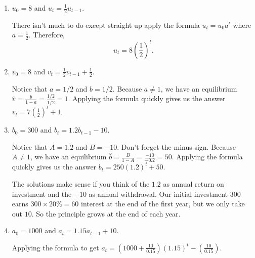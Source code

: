 \documentclass[../main.tex]{subfiles}
\begin{document}
\begin{exercise}
\begin{enumerate}
    \item \(u_{0} = 8\) and \(u_{t} = \frac{1}{2} u_{t-1}\).
      \begin{solution}
        There isn't much to do except straight up apply the formula \(u_{t} = u_{0} a^{t}\) where \(a = \frac{1}{2}\). Therefore, 
        \[
          u_{t} = 8 \left(\frac{1}{2}\right)^{t}.
        \]

      \end{solution}
    \item \(v_{0} = 8\) and \(v_{t} = \frac{1}{2} v_{t-1} + \frac{1}{2}\).
      \begin{solution}
        Notice that \(a = 1/2\) and \(b = 1/2\). Because \(a \ne 1\), we have an equilibrium \(\hat{v} = \frac{b}{1-a} = \frac{1/2}{1/2} = 1\).  Applying the formula quickly gives us the answer \(v_{t} = 7 \left(\frac{1}{2}\right)^{t} + 1\).
      \end{solution}
      
    \item \(b_{0} = 300\) and \(b_{t} = 1.2 b_{t-1} - 10\).
      \begin{solution}
        Notice that \(A = 1.2\) and \(B = -10\). Don't forget the minus sign. Because \(A \ne 1\), we have an equilibrium \(\hat{b} = \frac{B}{1-A} = \frac{-10}{-0.2} = 50\).  Applying the formula quickly gives us the answer \(b_{t} = 250 \left(1.2\right)^{t} + 50\).

        The solutions make sense if you think of the \(1.2\) as annual return on investment and the \(-10\) as annual withdrawal. Our initial investment \(300\) earns \(300 \times 20\% = 60\) interest at the end of the first year, but we only take out \(10\). So the principle grows at the end of each year.
      \end{solution}

    \item \(a_{0} = 1000\) and \(a_{t} = 1.15 a_{t-1} + 10\).
      \begin{solution}
        Applying the formula to get \(a_{t} = \left(1000 + \frac{10}{0.15}\right) \left(1.15\right)^{t} - \left( \frac{10}{0.15} \right)\).
      \end{solution}

  \end{enumerate}
\end{exercise}
\end{document}
